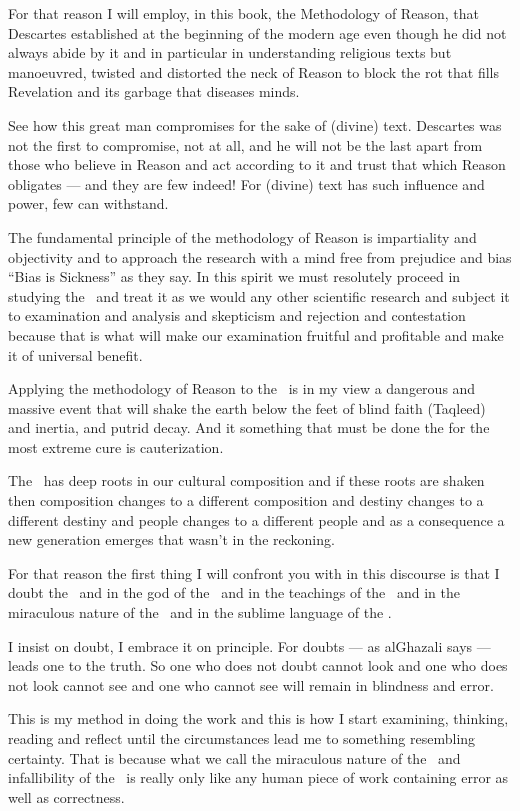 \documentclass[12pt]{memoir}
\begin{document}
For that reason I will employ, in this book, the Methodology of Reason, that
Descartes established at the beginning of the modern age even though he did not
always abide by it and in particular in understanding religious texts but
manoeuvred, twisted and distorted the neck of Reason
to block the rot that fills Revelation and its garbage that diseases minds.

See how this great man compromises for the sake of (divine) text.
Descartes was not the first to compromise, not at all,
and he will not be the last apart from those who believe
in Reason and act according to it and trust that which
Reason obligates — and they are few indeed!
For (divine) text has such influence and power, few can withstand.

The fundamental principle of the methodology of Reason is impartiality and
objectivity and to approach the research with a mind free from prejudice and
bias “Bias is Sickness” as they say. In this spirit we must resolutely proceed
in studying the \Quran\ and treat it as we would any other scientific research
and subject it to examination and analysis and skepticism and rejection and
contestation because that is what will make our examination fruitful and
profitable and make it of universal benefit.

Applying the methodology of Reason to the \Quran\ is in my view a dangerous and
massive event that will shake the earth below the feet of blind faith (Taqleed)
and inertia, and putrid decay. And it something that must be done the for the
most extreme cure is cauterization.

The \Quran\ has deep roots in our cultural composition and if these roots are
shaken then composition changes to a different composition and destiny changes
to a different destiny and people changes to a different people and as a
consequence a new generation emerges that wasn’t in the reckoning.

For that reason the first thing I will confront you with in this discourse is
that I doubt the \Quran\ and in the god of the \Quran\ and in the teachings of
the \Quran\ and in the miraculous nature of the \Quran\ and in the sublime
language of the \Quran.

I insist on doubt, I embrace it on principle.
For doubts — as al\–Ghazali says — leads one to the truth.
So one who does not doubt cannot look and one who does not look
cannot see and one who cannot see will remain in blindness and error.

This is my method in doing the work and this is how I start examining,
thinking, reading and reflect until the circumstances lead me to something
resembling certainty. That is because what we call the miraculous nature of the
\Quran\ and infallibility of the \Quran\ is really only like any human piece of
work containing error as well as correctness.
\end{document}
